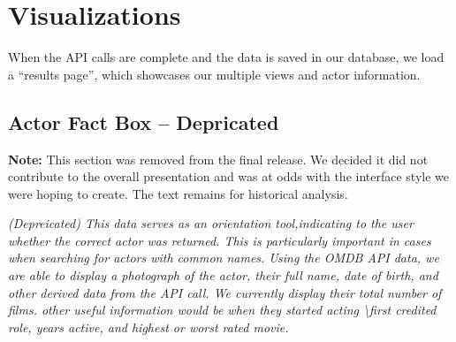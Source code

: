 \documentclass[12pt]{article}
\begin{document}
\section{Visualizations}
When the API calls are complete and the data is saved in our database, we load a ``results page'', which  showcases our multiple views and actor information. 


\subsection{Actor Fact Box -- Depricated}

\textbf{Note:}  This section was removed from the final release. We decided it did not contribute to the overall presentation and was at odds with the interface style we were hoping to create.  The text remains for  historical analysis.


\textit{ (Depreicated)	This data serves as an orientation tool,indicating to the user whether the correct actor was returned.  This is particularly important in cases when searching for actors with common names.  Using the OMDB API data, we are able to display a photograph of the actor, their full name, date of birth, and other derived data from the API call.  We currently display their total number of films.  other useful information would be when they started acting \textbackslash first credited role, years active, and highest or worst rated movie.}
	
\end{document}
